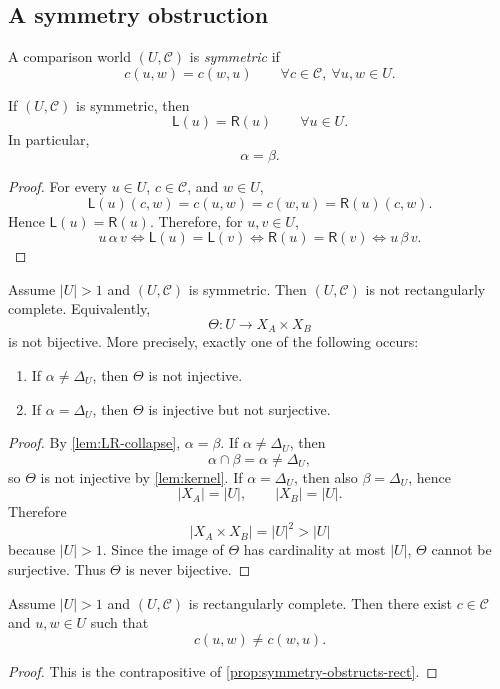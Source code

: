 \subsection{A symmetry obstruction}
\label{sec:symmetry-obstruction}
\begin{definition}
	A comparison world \((U,\mathcal C)\) is \emph{symmetric} if
	\[
		c(u,w)=c(w,u)
		\qquad
		\forall c\in\mathcal C,\ \forall u,w\in U.
	\]
\end{definition}
\begin{lemma}
	\label{lem:LR-collapse}
	If \((U,\mathcal C)\) is symmetric, then
	\[
		\mathsf L(u)=\mathsf R(u)
		\qquad
		\forall u\in U.
	\]
	In particular,
	\[
		\alpha=\beta.
	\]
\end{lemma}
\begin{proof}
	For every \(u\in U\), \(c\in\mathcal C\), and \(w\in U\),
	\[
		\mathsf L(u)(c,w)=c(u,w)=c(w,u)=\mathsf R(u)(c,w).
	\]
	Hence \(\mathsf L(u)=\mathsf R(u)\). Therefore, for \(u,v\in U\),
	\[
		u\,\alpha\,v
		\iff
		\mathsf L(u)=\mathsf L(v)
		\iff
		\mathsf R(u)=\mathsf R(v)
		\iff
		u\,\beta\,v.
	\]
\end{proof}
\begin{proposition}
	\label{prop:symmetry-obstructs-rect}
	Assume \(|U|>1\) and \((U,\mathcal C)\) is symmetric. Then
	\((U,\mathcal C)\) is not rectangularly complete. Equivalently,
	\[
		\Theta:U\to X_A\times X_B
	\]
	is not bijective.
	More precisely, exactly one of the following occurs:
	\begin{enumerate}
		\item[\emph{(K)}] If \(\alpha\neq\Delta_U\), then \(\Theta\) is not injective.
		\item[\emph{(R)}] If \(\alpha=\Delta_U\), then \(\Theta\) is injective but not surjective.
	\end{enumerate}
\end{proposition}
\begin{proof}
	By \cref{lem:LR-collapse}, \(\alpha=\beta\).
	If \(\alpha\neq\Delta_U\), then
	\[
		\alpha\cap\beta=\alpha\neq\Delta_U,
	\]
	so \(\Theta\) is not injective by \cref{lem:kernel}.
	If \(\alpha=\Delta_U\), then also \(\beta=\Delta_U\), hence
	\[
		|X_A|=|U|,
		\qquad
		|X_B|=|U|.
	\]
	Therefore
	\[
		|X_A\times X_B|=|U|^2>|U|
	\]
	because \(|U|>1\). Since the image of \(\Theta\) has cardinality at most
	\(|U|\), \(\Theta\) cannot be surjective.
	Thus \(\Theta\) is never bijective.
\end{proof}
\begin{corollary}
	Assume \(|U|>1\) and \((U,\mathcal C)\) is rectangularly complete.
	Then there exist \(c\in\mathcal C\) and \(u,w\in U\) such that
	\[
		c(u,w)\neq c(w,u).
	\]
\end{corollary}
\begin{proof}
	This is the contrapositive of
	\cref{prop:symmetry-obstructs-rect}.
\end{proof}
